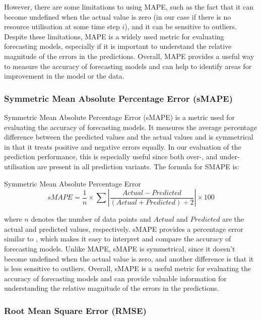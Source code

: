       However, there are some limitations to using MAPE, such as the fact that it can become undefined when the actual value is zero (in our case if there is no resource utilisation at some time step $i$), and it can be sensitive to outliers.
      Despite these limitations, MAPE is a widely used metric for evaluating forecasting models, especially if it is important to understand the relative magnitude of the errors in the predictions. 
      Overall, MAPE provides a useful way to measure the accuracy of forecasting models and can help to identify areas for improvement in the model or the data.


    \subsubsection{Symmetric Mean Absolute Percentage Error (sMAPE)}
    \label{sec:smape-metrics-evaluation}
    
      Symmetric Mean Absolute Percentage Error (sMAPE) \cite{kreinovichHowEstimateForecasting2014} is a metric used for evaluating the accuracy of forecasting models. It measures the average percentage difference between the predicted values and the actual values and is symmetrical in that it treats positive and negative errors equally.
      In our evaluation of the prediction performance, this is especially useful since both over-, and under-utilisation are present in all prediction variants.
      The formula for SMAPE is:

      \begin{pabox}{Symmetric Mean Absolute Percentage Error}
        $$sMAPE = \frac{1}{n} \times \sum \left|\frac{Actual - Predicted}{\left(Actual + Predicted\right) \div 2}\right| \times 100$$
      \end{pabox}
      where $n$ denotes the number of data points and $Actual$ and $Predicted$ are the actual and predicted values, respectively.
      sMAPE provides a percentage error similar to , which makes it easy to interpret and compare the accuracy of forecasting models. Unlike MAPE, sMAPE is symmetrical, since it doesn't become undefined when the actual value is zero, and another difference is that it is less sensitive to outliers.
      Overall, sMAPE is a useful metric for evaluating the accuracy of forecasting models and can provide valuable information for understanding the relative magnitude of the errors in the predictions.

    \subsubsection{Root Mean Square Error (RMSE)}
    \label{sec:rmse-metrics-evaluation}

